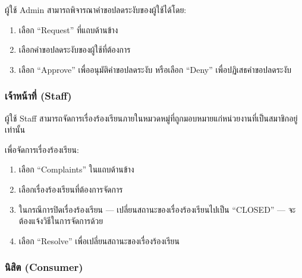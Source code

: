 \pagebreak[4]


ผู้ใช้ Admin สามารถพิจารณาคำขอปลดระงับของผู้ใช้ได้โดย:

\begin{enumerate}
    \item เลือก ``Request'' ที่แถบด้านข้าง
    \item เลือกคำขอปลดระงับของผู้ใช้ที่ต้องการ
    \item เลือก ``Approve'' เพื่ออนุมัติคำขอปลดระงับ หรือเลือก ``Deny'' เพื่อปฏิเสธคำขอปลดระงับ
\end{enumerate}

\pagebreak[4]

\subsubsection{เจ้าหน้าที่ (Staff)}\label{subsubsec:role-usage-staff}


ผู้ใช้ Staff สามารถจัดการเรื่องร้องเรียนภายในหมวดหมู่ที่ถูกมอบหมายแก่หน่วยงานที่เป็นสมาชิกอยู่เท่านั้น


เพื่อจัดการเรื่องร้องเรียน:

\begin{enumerate}
    \item เลือก  ``Complaints'' ในแถบด้านข้าง
    \item เลือกเรื่องร้องเรียนที่ต้องการจัดการ
    \item ในกรณีการปิดเรื่องร้องเรียน --- เปลี่ยนสถานะของเรื่องร้องเรียนไปเป็น ``CLOSED'' --- จะต้องแจ้งวิธีในการจัดการด้วย
    \item เลือก ``Resolve'' เพื่อเปลี่ยนสถานะของเรื่องร้องเรียน
\end{enumerate}

\pagebreak[4]

\subsubsection{นิสิต (Consumer)}\label{subsubsec:role-usage-consumer}




